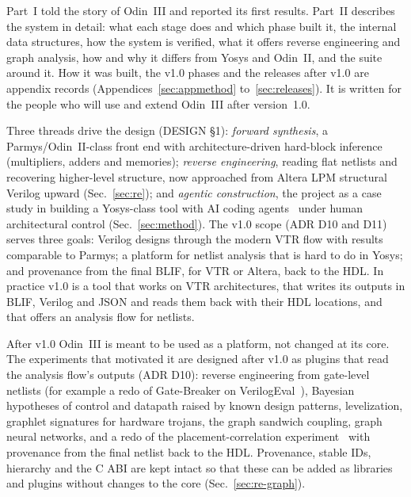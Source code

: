 \documentclass[conference]{IEEEtran}
\begin{document}
Part~I told the story of Odin~III and reported its first results. Part~II describes the system in
detail: what each stage does and which phase built it, the internal data structures, how the
system is verified, what it offers reverse engineering and graph analysis, how and why it differs
from Yosys and Odin~II, and the suite around it. How it was built, the v1.0 phases and the releases
after v1.0 are appendix records (Appendices~\ref{sec:appmethod} to~\ref{sec:releases}). It is written for the people who
will use and extend Odin~III after version~1.0.

Three threads drive the design (DESIGN \S1): \emph{forward synthesis}, a Parmys/Odin~II-class
front end with architecture-driven hard-block inference (multipliers, adders and memories);
\emph{reverse engineering}, reading flat netlists and recovering higher-level structure, now
approached from Altera LPM structural Verilog upward (Sec.~\ref{sec:re}); and \emph{agentic
construction}, the project as a case study in building a Yosys-class tool with AI coding
agents~ under human architectural control (Sec.~\ref{sec:method}). The v1.0 scope
(ADR D10 and D11) serves three goals: Verilog designs through the modern VTR flow with results
comparable to Parmys; a platform for netlist analysis that is hard to do in Yosys; and provenance
from the final BLIF, for VTR or Altera, back to the HDL. In practice v1.0 is a tool that works on
VTR architectures, that writes its outputs in BLIF, Verilog and JSON and reads them back with their
HDL locations, and that offers an analysis flow for netlists.

After v1.0 Odin~III is meant to be used as a platform, not changed at its core. The experiments
that motivated it are designed after v1.0 as plugins that read the analysis flow's outputs (ADR
D10): reverse engineering from gate-level netlists (for example a redo of Gate-Breaker on
VerilogEval~), Bayesian hypotheses of control and datapath
raised by known design patterns, levelization, graphlet signatures for hardware trojans, the graph
sandwich coupling, graph neural networks, and a redo of the placement-correlation
experiment~ with provenance from the final
netlist back to the HDL. Provenance, stable IDs, hierarchy and the C ABI are kept intact so that
these can be added as libraries and plugins without changes to the core (Sec.~\ref{sec:re-graph}).

\end{document}
